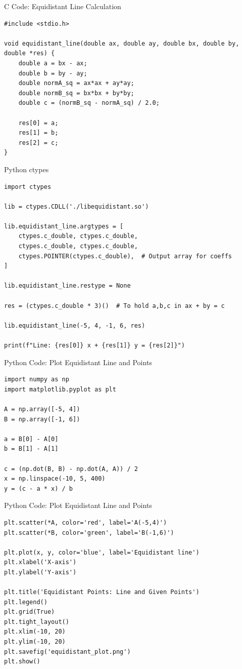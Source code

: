 \documentclass{beamer}
\begin{document}
\begin{frame}[fragile]{C Code: Equidistant Line Calculation}
\begin{verbatim}
#include <stdio.h>

void equidistant_line(double ax, double ay, double bx, double by,
double *res) {
    double a = bx - ax;
    double b = by - ay;
    double normA_sq = ax*ax + ay*ay;
    double normB_sq = bx*bx + by*by;
    double c = (normB_sq - normA_sq) / 2.0;

    res[0] = a;
    res[1] = b;
    res[2] = c;
}
\end{verbatim}
\end{frame}


\begin{frame}[fragile]{Python ctypes}
\begin{verbatim}
import ctypes

lib = ctypes.CDLL('./libequidistant.so')

lib.equidistant_line.argtypes = [
    ctypes.c_double, ctypes.c_double,
    ctypes.c_double, ctypes.c_double,
    ctypes.POINTER(ctypes.c_double),  # Output array for coeffs
]

lib.equidistant_line.restype = None

res = (ctypes.c_double * 3)()  # To hold a,b,c in ax + by = c

lib.equidistant_line(-5, 4, -1, 6, res)

print(f"Line: {res[0]} x + {res[1]} y = {res[2]}")
\end{verbatim}
\end{frame}
\begin{frame}[fragile]{Python Code: Plot Equidistant Line and Points}
\begin{verbatim}
import numpy as np
import matplotlib.pyplot as plt

A = np.array([-5, 4])
B = np.array([-1, 6])

a = B[0] - A[0]
b = B[1] - A[1]

c = (np.dot(B, B) - np.dot(A, A)) / 2
x = np.linspace(-10, 5, 400)
y = (c - a * x) / b
\end{verbatim}
\end{frame}

\begin{frame}[fragile]{Python Code: Plot Equidistant Line and Points}
\begin{verbatim}
plt.scatter(*A, color='red', label='A(-5,4)')
plt.scatter(*B, color='green', label='B(-1,6)')

plt.plot(x, y, color='blue', label='Equidistant line')
plt.xlabel('X-axis')
plt.ylabel('Y-axis')

plt.title('Equidistant Points: Line and Given Points')
plt.legend()
plt.grid(True)
plt.tight_layout()
plt.xlim(-10, 20)
plt.ylim(-10, 20)
plt.savefig('equidistant_plot.png')
plt.show()
\end{verbatim}
\end{frame}
\end{document}
